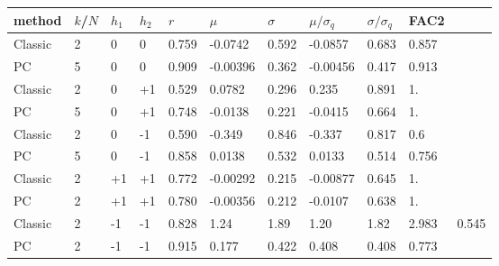 \begin{tabular}{|llll|lll|lll|}
	\hline
method & $k$/$N$ & $h_1$ & $h_2$ & $r$ & $\mu$ & $\sigma$ & $\mu/\sigma_q$ & $\sigma/\sigma_q$ & FAC2 \\\hline\hline
	Classic & 2 &  0 & 0 & 0.759 & -0.0742 & 0.592 & -0.0857 & 0.683 & 0.857 \\
	PC & 5 & 0 & 0 & 0.909 & -0.00396 & 0.362 & -0.00456 & 0.417 & 0.913 \\
	\hline
	Classic & 2 & 0 & +1 & 0.529 & 0.0782 & 0.296 & 0.235 & 0.891 & 1. \\
	PC & 5 & 0 & +1 & 0.748 & -0.0138 & 0.221 & -0.0415 & 0.664 & 1. \\
	\hline
	Classic & 2 & 0 & -1 & 0.590 & -0.349 & 0.846 & -0.337 & 0.817 & 0.6 \\
	PC & 5 &  0 & -1 & 0.858 & 0.0138 & 0.532 & 0.0133 & 0.514 & 0.756 \\
	\hline
	Classic & 2 & +1 & +1 & 0.772 & -0.00292 & 0.215 & -0.00877 & 0.645 & 1. \\
	PC & 2 & +1 & +1 & 0.780 & -0.00356 & 0.212 & -0.0107 & 0.638 & 1. \\
	\hline
	Classic & 2 & -1 & -1 & 0.828 & 1.24 & 1.89 & 1.20 & 1.82 & 2.983 & 0.545 \\
	PC & 2 & -1 & -1 & 0.915 & 0.177 & 0.422 & 0.408 & 0.408 & 0.773 \\
	\hline
\end{tabular}



